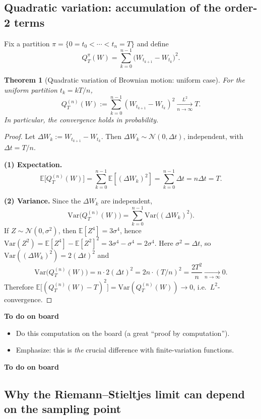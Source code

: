 \documentclass[11pt]{article}
\newcommand{\E}{\mathbb{E}}
\newcommand{\1}{\mathbf{1}}
\numberwithin{equation}{section}
\theoremstyle{plain}
\newtheorem{theorem}{Theorem}[section]
\theoremstyle{definition}
\theoremstyle{remark}
\begin{document}
\subsection{Quadratic variation: accumulation of the order-2 terms}

Fix a partition $\pi=\{0=t_0<\cdots<t_n=T\}$ and define
\[
Q_T^\pi(W)=\sum_{k=0}^{n-1}\big(W_{t_{k+1}}-W_{t_k}\big)^2.
\]

\begin{theorem}[Quadratic variation of Brownian motion: uniform case]
For the uniform partition $t_k=kT/n$,
\[
Q_T^{(n)}(W):=\sum_{k=0}^{n-1}(W_{t_{k+1}}-W_{t_k})^2 \xrightarrow[n\to\infty]{L^2} T.
\]
In particular, the convergence holds in probability.
\end{theorem}

\begin{proof}
Let $\Delta W_k:=W_{t_{k+1}}-W_{t_k}$. Then $\Delta W_k\sim\mathcal N(0,\Delta t)$,
independent, with $\Delta t=T/n$.

\smallskip
\noindent\textbf{(1) Expectation.}
\[
\E\big[Q_T^{(n)}(W)\big]=\sum_{k=0}^{n-1}\E[(\Delta W_k)^2]=\sum_{k=0}^{n-1}\Delta t = n\Delta t = T.
\]

\smallskip
\noindent\textbf{(2) Variance.}
Since the $\Delta W_k$ are independent,
\[
\mathrm{Var}\big(Q_T^{(n)}(W)\big)
=\sum_{k=0}^{n-1}\mathrm{Var}\big((\Delta W_k)^2\big).
\]
If $Z\sim\mathcal N(0,\sigma^2)$, then $\E[Z^4]=3\sigma^4$, hence
$\mathrm{Var}(Z^2)=\E[Z^4]-\E[Z^2]^2=3\sigma^4-\sigma^4=2\sigma^4$.
Here $\sigma^2=\Delta t$, so $\mathrm{Var}((\Delta W_k)^2)=2(\Delta t)^2$ and
\[
\mathrm{Var}\big(Q_T^{(n)}(W)\big)=n\cdot 2(\Delta t)^2
=2n\cdot (T/n)^2=\frac{2T^2}{n}\xrightarrow[n\to\infty]{}0.
\]
Therefore $\E\big[(Q_T^{(n)}(W)-T)^2\big]=\mathrm{Var}(Q_T^{(n)}(W))\to 0$, i.e.\ $L^2$-convergence.
\end{proof}

\textbf{To do on board}
\begin{itemize}
  \item Do this computation on the board (a great ``proof by computation'').
  \item Emphasize: this is \emph{the} crucial difference with finite-variation functions.
\end{itemize}
\textbf{To do on board}

\subsection{Why the Riemann--Stieltjes limit can depend on the sampling point}
\end{document}
